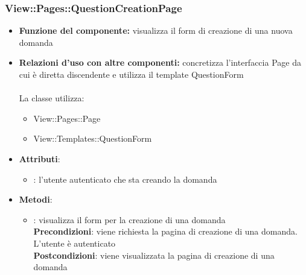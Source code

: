 \subsubsection{View::Pages::QuestionCreationPage}
\begin{itemize}
\item\textbf{Funzione del componente:} visualizza il form di creazione di una nuova domanda
				\item\textbf{Relazioni d'uso con altre componenti:} concretizza l'interfaccia Page da cui è diretta discendente e utilizza il template QuestionForm\\ \\
La classe utilizza:
	\begin{itemize}
		\item View::Pages::Page\\
		\item View::Templates::QuestionForm\\
	\end{itemize}
\item\textbf{Attributi}:
	\begin{itemize}
		\item{}: l'utente autenticato che sta creando la domanda\\
	\end{itemize}
\item\textbf{Metodi}:
	\begin{itemize}
		\item{}: visualizza il form per la creazione di una domanda\\
		\textbf{Precondizioni}: viene richiesta la pagina di creazione di una domanda. L'utente è autenticato\\
		\textbf{Postcondizioni}: viene visualizzata la pagina di creazione di una domanda\\
	\end{itemize}
\end{itemize}

